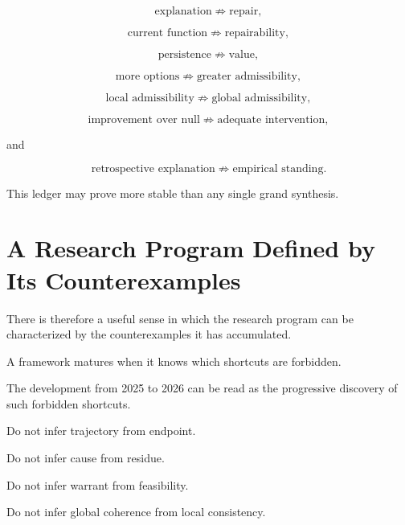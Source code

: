 \documentclass[11pt]{article}
\theoremstyle{remark}
\begin{document}
\begin{equation}
\text{explanation}
\not\Rightarrow
\text{repair},
\end{equation}

\begin{equation}
\text{current function}
\not\Rightarrow
\text{repairability},
\end{equation}

\begin{equation}
\text{persistence}
\not\Rightarrow
\text{value},
\end{equation}

\begin{equation}
\text{more options}
\not\Rightarrow
\text{greater admissibility},
\end{equation}

\begin{equation}
\text{local admissibility}
\not\Rightarrow
\text{global admissibility},
\end{equation}

\begin{equation}
\text{improvement over null}
\not\Rightarrow
\text{adequate intervention},
\end{equation}

and

\begin{equation}
\text{retrospective explanation}
\not\Rightarrow
\text{empirical standing}.
\end{equation}

This ledger may prove more stable than any single grand synthesis.

\section{A Research Program Defined by Its Counterexamples}

There is therefore a useful sense in which the research program can be characterized by the counterexamples it has accumulated.

A framework matures when it knows which shortcuts are forbidden.

The development from 2025 to 2026 can be read as the progressive discovery of such forbidden shortcuts.

Do not infer trajectory from endpoint.

Do not infer cause from residue.

Do not infer warrant from feasibility.

Do not infer global coherence from local consistency.
\end{document}
